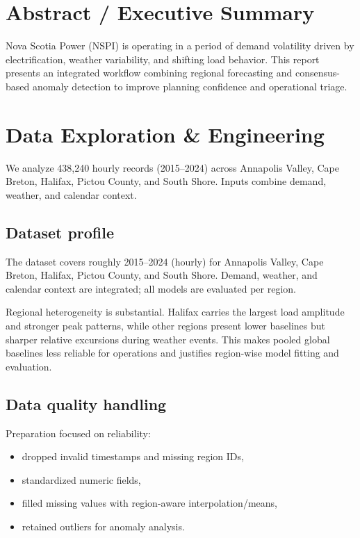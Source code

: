 \section*{Abstract / Executive Summary}

Nova Scotia Power (NSPI) is operating in a period of demand volatility driven by electrification, weather variability, and shifting load behavior. This report presents an integrated workflow combining regional forecasting and consensus-based anomaly detection to improve planning confidence and operational triage.

\section{Data Exploration \& Engineering}
\label{sec:1_introduction}

We analyze 438,240 hourly records (2015--2024) across Annapolis Valley, Cape Breton, Halifax, Pictou County, and South Shore. Inputs combine demand, weather, and calendar context.

\subsection{Dataset profile}
The dataset covers roughly 2015--2024 (hourly) for Annapolis Valley, Cape Breton, Halifax, Pictou County, and South Shore. Demand, weather, and calendar context are integrated; all models are evaluated per region.

Regional heterogeneity is substantial. Halifax carries the largest load amplitude and stronger peak patterns, while other regions present lower baselines but sharper relative excursions during weather events. This makes pooled global baselines less reliable for operations and justifies region-wise model fitting and evaluation.

\subsection{Data quality handling}
Preparation focused on reliability:
\begin{itemize}
	\item dropped invalid timestamps and missing region IDs,
	\item standardized numeric fields,
	\item filled missing values with region-aware interpolation/means,
	\item retained outliers for anomaly analysis.
\end{itemize}

